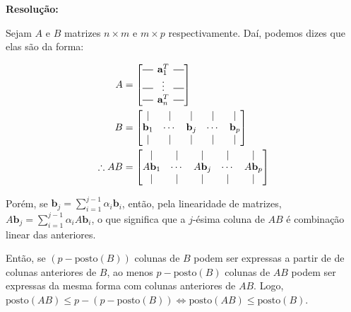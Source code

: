 \documentclass[leqno]{article}
\newcommand*{\horzbar}{\rule[0.5ex]{2.5ex}{0.5pt}}
\begin{document}
\begin{enumerate}
    \textbf{Resolução:}
    
    Sejam $A$ e $B$ matrizes $n\times m$ e $m\times p$ respectivamente. Daí, podemos dizes que elas são da forma:
    
    \begin{align*}
        A&=\begin{bmatrix}
        \horzbar \hspace{-0.2cm} & \textbf{a}_1^T & \hspace{-0.2cm} \horzbar\\
        \horzbar \hspace{-0.2cm} & \vdots & \hspace{-0.2cm} \horzbar\\
        \horzbar \hspace{-0.2cm} & \textbf{a}_n^T & \hspace{-0.2cm} \horzbar\\
        \end{bmatrix}\\
        B&=\begin{bmatrix}
        \vert & \vert & \vert & \vert & \vert\\
        \textbf{b}_1 & \cdots & \textbf{b}_j & \cdots & \textbf{b}_p\\
        \vert & \vert & \vert & \vert & \vert\\
        \end{bmatrix}\\
        \therefore AB&=\begin{bmatrix}
        \vert & \vert & \vert & \vert & \vert\\
        A\textbf{b}_1 & \cdots & A\textbf{b}_j & \cdots & A\textbf{b}_p\\
        \vert & \vert & \vert & \vert & \vert\\
        \end{bmatrix}
    \end{align*}
    
    Porém, se $\textbf{b}_j=\sum_{i=1}^{j-1}\alpha_i\textbf{b}_i$, então, pela linearidade de matrizes, $A\textbf{b}_j=\sum_{i=1}^{j-1}\alpha_iA\textbf{b}_i$, o que significa que a $j$-ésima coluna de $AB$ é combinação linear das anteriores.
    
    Então, se $(p-\text{posto}(B))$ colunas de $B$ podem ser expressas a partir de de colunas anteriores de $B$, ao menos $p-\text{posto}(B)$ colunas de $AB$ podem ser expressas da mesma forma com colunas anteriores de $AB$. Logo, $\text{posto}(AB)\leq p-(p-\text{posto}(B))\iff\text{posto}(AB)\leq\text{posto}(B)$.
    

\end{enumerate}
\end{document}
